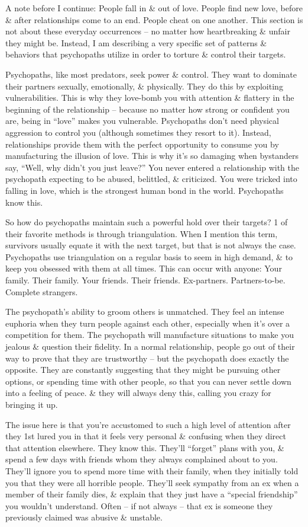 \documentclass{article}
\numberwithin{equation}{section}
\begin{document}
A note before I continue: People fall in \& out of love. People find new love, before \& after relationships come to an end. People cheat on one another. This section is not about these everyday occurrences -- no matter how heartbreaking \& unfair they might be. Instead, I am describing a very specific set of patterns \& behaviors that psychopaths utilize in order to torture \& control their targets.

Psychopaths, like most predators, seek power \& control. They want to dominate their partners sexually, emotionally, \& physically. They do this by exploiting vulnerabilities. This is why they love-bomb you with attention \& flattery in the beginning of the relationship -- because no matter how strong or confident you are, being in ``love'' makes you vulnerable. Psychopaths don't need physical aggression to control you (although sometimes they resort to it). Instead, relationships provide them with the perfect opportunity to consume you by manufacturing the illusion of love. This is why it's so damaging when bystanders say, ``Well, why didn't you just leave?'' You never entered a relationship with the psychopath expecting to be abused, belittled, \& criticized. You were tricked into falling in love, which is the strongest human bond in the world. Psychopaths know this.

So how do psychopaths maintain such a powerful hold over their targets? 1 of their favorite methods is through triangulation. When I mention this term, survivors usually equate it with the next target, but that is not always the case. Psychopaths use triangulation on a regular basis to seem in high demand, \& to keep you obsessed with them at all times. This can occur with anyone: Your family. Their family. Your friends. Their friends. Ex-partners. Partners-to-be. Complete strangers.

The psychopath's ability to groom others is unmatched. They feel an intense euphoria when they turn people against each other, especially when it's over a competition for them. The psychopath will manufacture situations to make you jealous \& question their fidelity. In a normal relationship, people go out of their way to prove that they are trustworthy -- but the psychopath does exactly the opposite. They are constantly suggesting that they might be pursuing other options, or spending time with other people, so that you can never settle down into a feeling of peace. \& they will always deny this, calling you crazy for bringing it up.

The issue here is that you're accustomed to such a high level of attention after they 1st lured you in that it feels very personal \& confusing when they direct that attention elsewhere. They know this. They'll ``forget'' plans with you, \& spend a few days with friends whom they always complained about to you. They'll ignore you to spend more time with their family, when they initially told you that they were all horrible people. They'll seek sympathy from an ex when a member of their family dies, \& explain that they just have a ``special friendship'' you wouldn't understand. Often -- if not always -- that ex is someone they previously claimed was abusive \& unstable.
\end{document}
